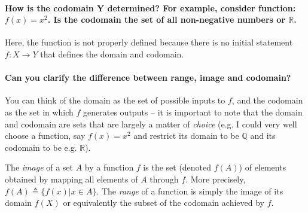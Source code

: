 \documentclass[10pt,english]{article}
\begin{document}
\paragraph{How is the codomain Y determined? For example, consider function: $f(x) = x^2$. Is the codomain the set of all non-negative numbers or $\mathbb{R}$.}

Here, the function is not properly defined because there is no initial statement $f\colon X \to Y$ that defines the domain and codomain.

\paragraph{Can you clarify the difference between range, image and codomain?}
You can think of the domain as the set of possible inputs to $f$, and the codomain as the set in which $f$ generates outputs -- it is important to note that the domain and codomain are sets that are largely a matter of \textit{choice} (e.g. I could very well choose a function, say $f(x) = x^2$ and restrict its domain to be $\mathbb{Q}$ and its codomain to be e.g. $\mathbb{R}$).

The \textit{image} of a set $A$ by a function $f$ is the set (denoted $f(A)$) of elements obtained by mapping all elements of $A$ through $f$. More precisely, $f(A) \triangleq \{f(x) | x\in A\}$.
The \textit{range} of a function is simply the image of its domain $f(X)$ or equivalently the subset of the codomain achieved by $f$.
\end{document}
